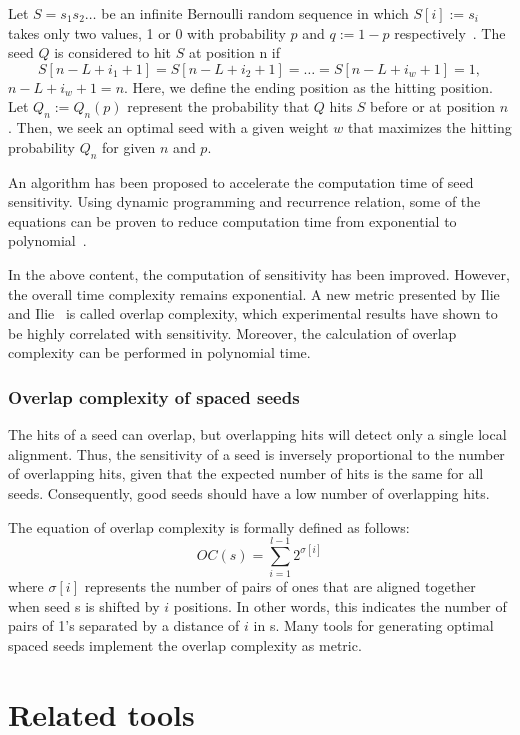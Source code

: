 \documentclass[PhD]{PHlab-thesis}
\begin{document}
Let $S=s_1s_2\ldots$ be an infinite Bernoulli random sequence in which $S[i]:=s_i$ takes only two values, 1 or 0 with probability $p$ and $q:=1-p$ respectively~\cite{SensSpacedSeed}. The seed $Q$ is considered to hit $S$ at position n if
\begin{equation}
S[n-L+i_1+1]=S[n-L+i_2+1]= \ldots =S[n-L+i_w+1]=1,
\end{equation}
$n-L+i_w+1=n$. Here, we define the ending position as the hitting position. Let $Q_n:=Q_n(p)$ represent the probability that $Q$ hits $S$ before or at position $n$. Then, we seek an optimal seed with a given weight $w$ that maximizes the hitting probability $Q_n$ for given $n$ and $p$.

An algorithm has been proposed to accelerate the computation time of seed sensitivity. Using dynamic programming and recurrence relation, some of the equations can be proven to reduce computation time from exponential to polynomial~\cite{sensDP}.

In the above content, the computation of sensitivity has been improved. However, the overall time complexity remains exponential. A new metric presented by Ilie and Ilie~\cite{SpEED} is called overlap complexity, which experimental results have shown to be highly correlated with sensitivity. Moreover, the calculation of overlap complexity can be performed in polynomial time.

\subsubsection{Overlap complexity of spaced seeds}
The hits of a seed can overlap, but overlapping hits will detect only a single local alignment. Thus, the sensitivity of a seed is inversely proportional to the number of overlapping hits, given that the expected number of hits is the same for all seeds. Consequently, good seeds should have a low number of overlapping hits.

The equation of overlap complexity is formally defined as follows:
\begin{equation}
    OC(s) = \sum\limits_{i = 1}^{l-1}2^{\sigma[i]}
\end{equation}
where $\sigma[i]$ represents the number of pairs of ones that are aligned together when seed s is shifted by $i$ positions. In other words, this indicates the number of pairs of 1's separated by a distance of $i$ in s. Many tools for generating optimal spaced seeds implement the overlap complexity as metric.

\section{Related tools}
\end{document}
